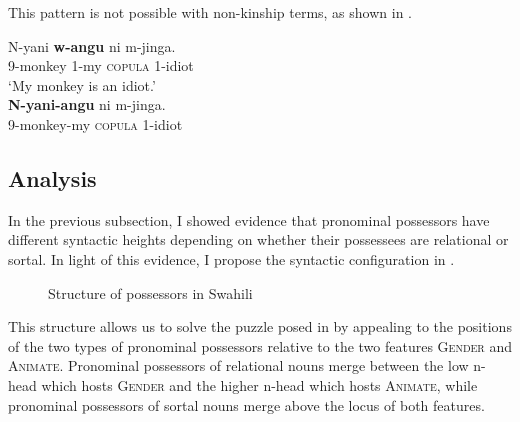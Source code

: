 \documentclass[output=paper
,newtxmath
,modfonts
,nonflat]{langsci/langscibook}
\begin{document}
This pattern is not possible with non-kinship terms, as shown in .

\ea\label{ex:pesetsky:nyaniwangu} 
\ea\label{ex:pesetsky:nyaniwangua}{ \gll N-yani \textbf{w-angu} ni m-jinga. \\ \textsc{9}-monkey \textsc{1}-my \textsc{copula} \textsc{1}-idiot \\ \glt `My monkey is an idiot.' \\ }
\ex\label{ex:pesetsky:nyaniwangub}{ \gll  \textbf{N-yani-angu} ni m-jinga. \\ \textsc{9}-monkey-my \textsc{copula} \textsc{1}-idiot \\ } \z \z

\subsection{Analysis}\label{sec:pesetsky:analysissubsection}

In the previous subsection, I showed evidence that pronominal possessors have different syntactic heights depending on whether their possessees are relational or sortal.  In light of this evidence, I propose the syntactic configuration in .

\begin{figure}[htbp]
\begin{center}


\caption{Structure of possessors in Swahili}
\label{ex:pesetsky:syntacticconfig}
\end{center}
\end{figure}

This structure allows us to solve the puzzle posed in  by appealing to the positions of the two types of pronominal possessors relative to the two features \textsc{Gender} and \textsc{Animate}. Pronominal possessors of relational nouns merge between the low n-head which hosts \textsc{Gender} and the higher n-head which hosts \textsc{Animate}, while pronominal possessors of sortal nouns merge above the locus of both features. 
\end{document}
